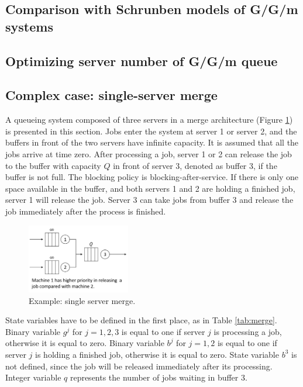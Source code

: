 \documentclass[suppldata]{interact}
\theoremstyle{plain}
\theoremstyle{definition}
\theoremstyle{remark}
\begin{document}
\subsection{Comparison with Schrunben models of G/G/m systems}


\subsection{Optimizing server number of G/G/m queue}

\subsection{Complex case: single-server merge}

A queueing system composed of three servers in a merge architecture (Figure \ref{fig:merge}) is presented in this section. Jobs enter the system at server 1 or server 2, and the buffers in front of the two servers have infinite capacity. It is assumed that all the jobs arrive at time zero. After processing a job, server 1 or 2 can release the job to the buffer with capacity $Q$ in front of server 3, denoted as buffer 3, if the buffer is not full. The blocking policy is blocking-after-service. If there is only one space available in the buffer, and both servers 1 and 2 are holding a finished job, server 1 will release the job. Server 3 can take jobs from buffer 3 and release the job immediately after the process is finished. 

\begin{figure}[h]
	\centering
	\includegraphics[width=0.4\textwidth]{Figures/merge.png}
	\caption{Example: single server merge.}
	\label{fig:merge}
\end{figure}

State variables have to be defined in the first place, as in Table \ref{tab:merge}. Binary variable $g^{j}$ for $j=1,2,3$ is equal to one if server $j$ is processing a job, otherwise it is equal to zero. Binary variable $b^{j}$ for $j=1,2$ is equal to one if server $j$ is holding a finished job, otherwise it is equal to zero. State variable $b^3$ is not defined, since the job will be released immediately after its processing. Integer variable $q$ represents the number of jobs waiting in buffer 3. 
\end{document}

